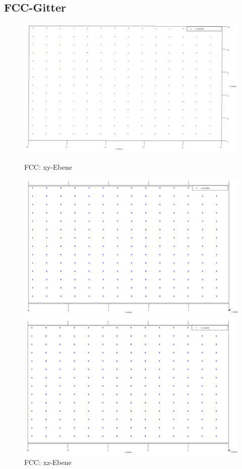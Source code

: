 \subsection{FCC-Gitter}

\begin{figure}[H]
\begin{minipage}[b]{0.3\textwidth}
    \centering
    \includegraphics[scale=0.12]{data/fcc_x-y.PNG}
    \caption{FCC: xy-Ebene}
    \label{fig:fccxy}
\end{minipage}    
\begin{minipage}[b]{0.3\textwidth}
    \centering
    \includegraphics[scale=0.12]{data/fcc_x-z.PNG}
    \caption{FCC: xz-Ebene}
    \label{fig:fccxz}
\end{minipage} 
\begin{minipage}[b]{0.3\textwidth}
    \centering
    \includegraphics[scale=0.12]{data/fcc_y-z.PNG}

\end{minipage}
\end{figure}
